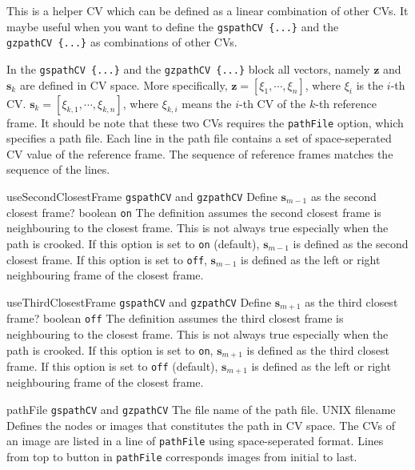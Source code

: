 
This is a helper CV which can be defined as a linear combination of other CVs. It maybe useful when you want to define the \texttt{gspathCV~\{...\}} and the \texttt{gzpathCV~\{...\}} as  combinations of other CVs.


In the \texttt{gspathCV~\{...\}} and the \texttt{gzpathCV~\{...\}} block all vectors, namely $\mathbf{z}$ and $\mathbf{s}_{k}$ are defined in CV space.  More specifically, $\mathbf{z} = \left[{\xi}_{1}, \cdots, {\xi}_{n}\right]$, where ${\xi}_{i}$ is the $i$-th CV. $\mathbf{s}_{k} = \left[{\xi}_{k,1}, \cdots, {\xi}_{k,n}\right]$, where ${\xi}_{k,i}$ means the $i$-th CV of the $k$-th reference frame. It should be note that these two CVs requires the \texttt{pathFile} option, which specifies a path file. Each line in the path file contains a set of space-seperated CV value of the reference frame. The sequence of reference frames matches the sequence of the lines.


\begin{cvcoptions}
\item %
  \keydef
    {useSecondClosestFrame}{%
    \texttt{gspathCV} and \texttt{gzpathCV}}{%
    Define $\mathbf{s}_{m-1}$ as the second closest frame?}{%
    boolean}{%
    \texttt{on}}{%
    The definition assumes the second closest frame is neighbouring to the closest frame. This is not always true especially when the path is crooked. If this option is set to \texttt{on} (default), $\mathbf{s}_{m-1}$ is defined as the second closest frame. If this option is set to \texttt{off}, $\mathbf{s}_{m-1}$ is defined as the left or right neighbouring frame of the closest frame.
  }

\item %
  \keydef
    {useThirdClosestFrame}{%
    \texttt{gspathCV} and \texttt{gzpathCV}}{%
    Define $\mathbf{s}_{m+1}$ as the third closest frame?}{%
    boolean}{%
    \texttt{off}}{%
    The definition assumes the third closest frame is neighbouring to the closest frame. This is not always true especially when the path is crooked. If this option is set to \texttt{on}, $\mathbf{s}_{m+1}$ is defined as the third closest frame. If this option is set to \texttt{off} (default), $\mathbf{s}_{m+1}$ is defined as the left or right neighbouring frame of the closest frame.
  }

\item %
  \key
    {pathFile}{%
    \texttt{gspathCV} and \texttt{gzpathCV}}{%
    The file name of the path file.}{%
    UNIX filename}{%
		Defines the nodes or images that constitutes the path in CV space. The CVs of an image are listed in a line of \texttt{pathFile} using space-seperated format. Lines from top to button in \texttt{pathFile} corresponds images from initial to last.
    }

\end{cvcoptions}

